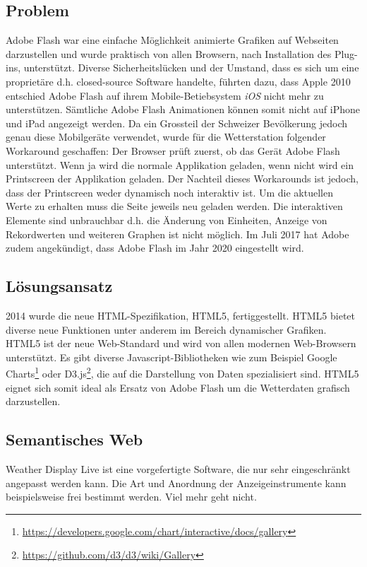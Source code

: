 \subsection*{Problem}
Adobe Flash war eine einfache Möglichkeit animierte Grafiken auf Webseiten darzustellen und wurde praktisch von allen Browsern, nach Installation des Plug-ins, unterstützt. Diverse Sicherheitslücken und der Umstand, dass es sich um eine proprietäre d.h. closed-source Software handelte, führten dazu, dass Apple 2010 entschied Adobe Flash auf ihrem Mobile-Betiebsystem \textit{iOS} nicht mehr zu unterstützen\cite{Apple:ThoughtsOnFlash}. Sämtliche Adobe Flash Animationen können somit nicht auf iPhone und iPad angezeigt werden. Da ein Grossteil der Schweizer Bevölkerung jedoch genau diese Mobilgeräte verwendet, wurde für die Wetterstation folgender Workaround geschaffen: Der Browser prüft zuerst, ob das Gerät Adobe Flash unterstützt. Wenn ja wird die normale Applikation geladen, wenn nicht wird ein Printscreen der Applikation geladen. Der Nachteil dieses Workarounds ist jedoch, dass der Printscreen weder dynamisch noch interaktiv ist. Um die aktuellen Werte zu erhalten muss die Seite jeweils neu geladen werden. Die interaktiven Elemente sind unbrauchbar d.h. die Änderung von Einheiten, Anzeige von Rekordwerten und weiteren Graphen ist nicht möglich. Im Juli 2017 hat Adobe zudem angekündigt, dass Adobe Flash im Jahr 2020 eingestellt wird\cite{Adobe:FlashTheFutureofInteractiveContent}.

\subsection*{Lösungsansatz}
2014 wurde die neue HTML-Spezifikation, HTML5, fertiggestellt. HTML5 bietet diverse neue Funktionen unter anderem im Bereich dynamischer Grafiken. HTML5 ist der neue Web-Standard und wird von allen modernen Web-Browsern unterstützt. Es gibt diverse Javascript-Bibliotheken wie zum Beispiel Google Charts\footnote{ \url{https://developers.google.com/chart/interactive/docs/gallery}} oder D3.js\footnote{ \url{https://github.com/d3/d3/wiki/Gallery}}, die auf die Darstellung von Daten spezialisiert sind. HTML5 eignet sich somit ideal als Ersatz von Adobe Flash um die Wetterdaten grafisch darzustellen. 


\subsection{Semantisches Web}
Weather Display Live ist eine vorgefertigte Software, die nur sehr eingeschränkt angepasst werden kann. Die Art und Anordnung der Anzeigeinstrumente kann beispielsweise frei bestimmt werden. Viel mehr geht nicht.

